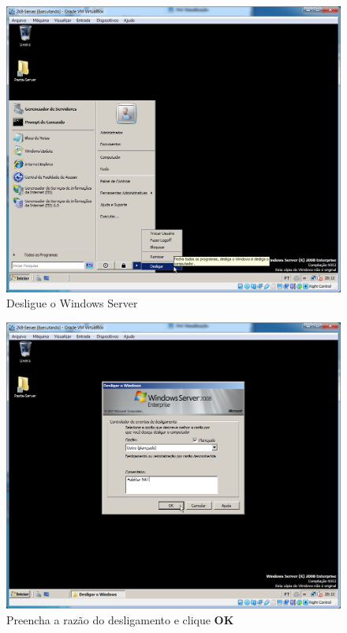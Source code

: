 \documentclass[10pt]{article}
\begin{document}
\begin{figure}[H]
    \centering
    \caption{Desligue o Windows Server}
    \label{fig:re001}
    \includegraphics[width=\linewidth]{images/rede_externa/re001.png}
\end{figure}
\begin{figure}[H]
    \centering
    \caption{Preencha a razão do desligamento e clique \textbf{OK}}
    \label{fig:re002}
    \includegraphics[width=\linewidth]{images/rede_externa/re002.png}
\end{figure}
\end{document}
